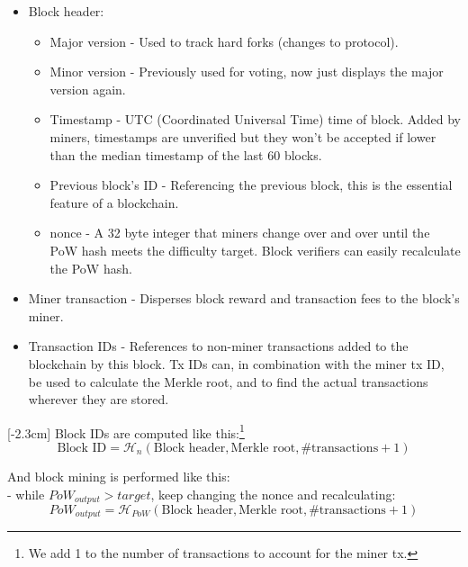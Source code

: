 \begin{itemize}
    \item Block header:
    \begin{itemize}
        \item Major version - Used to track hard forks (changes to protocol).
        \item Minor version - Previously used for voting, now just displays the major version again.
        \item Timestamp - UTC (Coordinated Universal Time) time of block. Added by miners, timestamps are unverified but they won't be accepted if lower than the median timestamp of the last 60 blocks. %
        \item Previous block's ID - Referencing the previous block, this is the essential feature of a blockchain.
        \item nonce - A 32 byte integer that miners change over and over until the PoW hash meets the difficulty target. Block verifiers can easily recalculate the PoW hash.
    \end{itemize}
    \item Miner transaction - Disperses block reward and transaction fees to the block's miner.
    \item Transaction IDs - References to non-miner transactions added to the blockchain by this block. Tx IDs can, in combination with the miner tx ID, be used to calculate the Merkle root, and to find the actual transactions wherever they are stored.
\end{itemize}
[-2.3cm]
Block IDs are computed like this:\footnote{We add 1 to the number of transactions to account for the miner tx.} %
\[ \textrm{Block ID} = \mathcal{H}_n(\textrm{Block header}, \textrm{Merkle root}, \# \textrm{transactions} + 1) \]

And block mining is performed like this:\\ %
\quad - while ${PoW}_{output} > {target}$, keep changing the nonce and recalculating:
\[ {PoW}_{output} = \mathcal{H}_{PoW}(\textrm{Block header}, \textrm{Merkle root}, \# \textrm{transactions} + 1) \]

